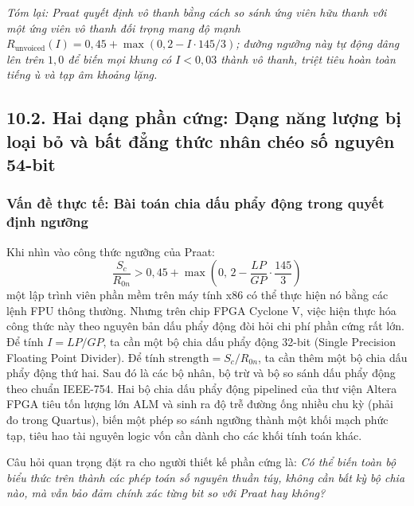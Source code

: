 \textit{Tóm lại: Praat quyết định vô thanh bằng cách so sánh ứng viên hữu thanh với một ứng viên vô thanh đối trọng mang độ mạnh $R_{\text{unvoiced}}(I) = 0{,}45 + \max(0, 2 - I \cdot 145/3)$; đường ngưỡng này tự động dâng lên trên $1{,}0$ để biến mọi khung có $I < 0{,}03$ thành vô thanh, triệt tiêu hoàn toàn tiếng ù và tạp âm khoảng lặng.}

\subsection*{10.2. Hai dạng phần cứng: Dạng năng lượng bị loại bỏ và bất đẳng thức nhân chéo số nguyên 54-bit}

\subsubsection*{Vấn đề thực tế: Bài toán chia dấu phẩy động trong quyết định ngưỡng}
Khi nhìn vào công thức ngưỡng của Praat:
\begin{equation*}
    \frac{S_c}{R_{0n}} > 0{,}45 + \max\left(0,\, 2 - \frac{LP}{GP} \cdot \frac{145}{3}\right)
\end{equation*}
một lập trình viên phần mềm trên máy tính x86 có thể thực hiện nó bằng các lệnh FPU thông thường. Nhưng trên chip FPGA Cyclone V, việc hiện thực hóa công thức này theo nguyên bản dấu phẩy động đòi hỏi chi phí phần cứng rất lớn.
Để tính $I = LP / GP$, ta cần một bộ chia dấu phẩy động 32-bit (Single Precision Floating Point Divider). Để tính $\text{strength} = S_c / R_{0n}$, ta cần thêm một bộ chia dấu phẩy động thứ hai. Sau đó là các bộ nhân, bộ trừ và bộ so sánh dấu phẩy động theo chuẩn IEEE-754.
Hai bộ chia dấu phẩy động pipelined của thư viện Altera FPGA tiêu tốn lượng lớn ALM và sinh ra độ trễ đường ống nhiều chu kỳ (phải đo trong Quartus), biến một phép so sánh ngưỡng thành một khối mạch phức tạp, tiêu hao tài nguyên logic vốn cần dành cho các khối tính toán khác.

Câu hỏi quan trọng đặt ra cho người thiết kế phần cứng là: \emph{Có thể biến toàn bộ biểu thức trên thành các phép toán số nguyên thuần túy, không cần bất kỳ bộ chia nào, mà vẫn bảo đảm chính xác từng bit so với Praat hay không?}

